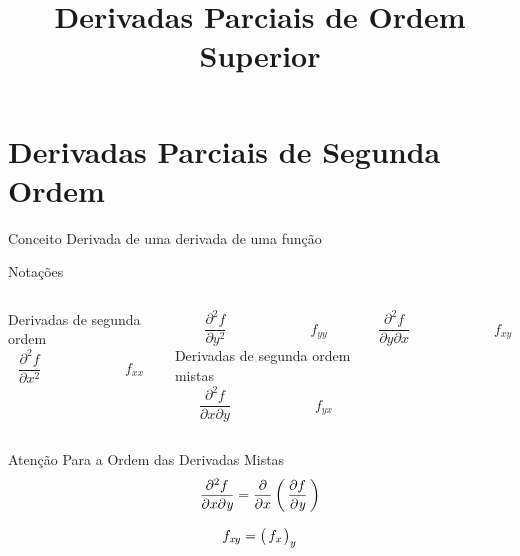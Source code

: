 
\usepackage{calculo_varias_variaveis-1}

\title {Derivadas Parciais de Ordem Superior}



\addtitle

\section{Derivadas Parciais de Segunda Ordem}

\begin{frame}{Conceito}
  Derivada de uma derivada de uma função
\end{frame}

\begin{frame}{Notações}
\begin{columns}
  Derivadas de segunda ordem
  \[
    \frac{\partial^2 f}{\partial x^2} \qquad\qquad\qquad
    f_{xx}
  \]

  \vspace{\baselineskip}
  \[
    \frac{\partial^2 f}{\partial y^2} \qquad\qquad\qquad
    f_{yy}
  \]
  \pause
  Derivadas de segunda ordem mistas
  \[
    \frac{\partial^2 f}{\partial x \partial y} \qquad\qquad\qquad
    f_{yx}
  \]

  \vspace{\baselineskip}
  \[
    \frac{\partial^2 f}{\partial y \partial x} \qquad\qquad\qquad
    f_{xy}
  \]
\end{columns}
\end{frame}

\begin{frame}{Atenção Para a Ordem das Derivadas Mistas}
  \[
    \frac{\partial^2 f}{\partial x \partial \emph{y}}
    = \frac{\partial}{\partial x}
      \left(\,\frac{\partial f}{\partial \emph{y}}\,\right)
  \]

  \vspace{\baselineskip}
  \[
    f_{\emph{x}y} = \big(\,f_\emph{x}\,\big)_y
  \]
\end{frame}

